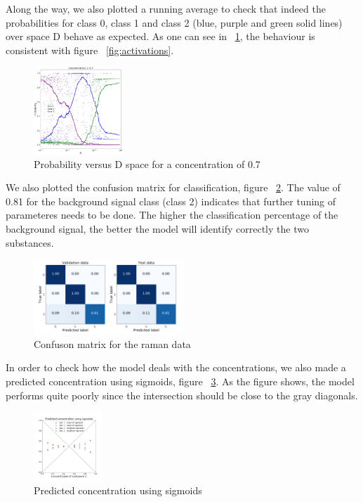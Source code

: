 \documentclass{article}
\begin{document}
Along the way, we also plotted a running average to check that indeed the probabilities for class 0, class 1 and class 2 (blue, purple and green solid lines) over space D behave as expected. As one can see in ~\ref{fig:Dspace}, the behaviour is consistent with figure ~\ref{fig:activations}.
\begin{figure}[!h]
	\centering
	\includegraphics[width=0.3\textwidth]{figures_3/DNN_D_vs_prob_6.png}
	\caption{Probability versus D space for a concentration of 0.7}
	\label{fig:Dspace}
\end{figure}

We also plotted the confusion matrix for classification, figure ~\ref{fig:confusion}. The value of 0.81 for the background signal class (class 2) indicates that further tuning of parameteres needs to be done. The higher the classification percentage of the background signal, the better the model will identify correctly the two substances.

\begin{figure}[!h]
  \centering
  \includegraphics[width=0.5\textwidth]{figures_2/raman_sim_3_conf_matrix13.png}
  \caption{Confuson matrix for the raman data}
  \label{fig:confusion}
\end{figure}

In order to check how the model deals with the concentrations, we also made a predicted concentration using sigmoids, figure ~\ref{fig:conc_sigmoids}. As the figure shows, the model performs quite poorly since the intersection should be close to the gray diagonals.

\begin{figure}[!h]
	\includegraphics[width=0.23\textwidth]{figures_2/DNN_pred_conc_sigmoid.png} 
	\caption{Predicted concentration using sigmoids}
	\label{fig:conc_sigmoids}
\end{figure}
\end{document}
